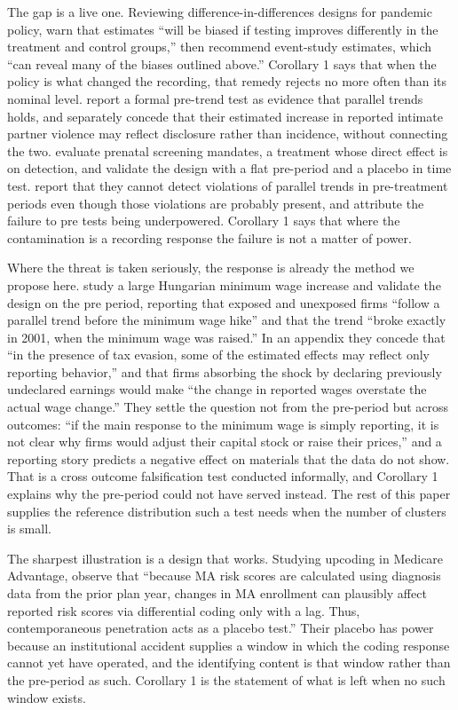 \documentclass[12pt]{article}
\theoremstyle{definition}
\numberwithin{equation}{section}
\begin{document}
The gap is a live one. Reviewing difference-in-differences designs for pandemic
policy,
\citet{goodmanbacon2020covid} warn that estimates ``will be biased if testing
improves differently in the treatment and control groups,'' then recommend
event-study estimates, which ``can reveal many of the biases outlined above.''
Corollary 1 says that when the policy is what changed the
recording, that remedy rejects no more often than its nominal level.
\citet{richardson2025ipv} report a formal pre-trend test as evidence that
parallel trends holds, and separately concede that their estimated increase in
reported intimate partner violence may reflect disclosure rather than incidence,
without connecting the two. \citet{baum2026syphilis} evaluate prenatal screening
mandates, a treatment whose direct effect is on detection, and validate the design
with a flat pre-period and a placebo in time test. \citet{callaway2023pandemic}
report that they cannot detect violations of parallel trends in pre-treatment periods even though those violations are probably present, and attribute the
failure to pre tests being underpowered. Corollary 1 says that
where the contamination is a recording response the failure is not a matter of
power.

Where the threat is taken seriously, the response is already the method we
propose here. \citet{harasztosi2019minwage} study a large
Hungarian minimum wage increase and validate the design on the pre period,
reporting that exposed and unexposed firms ``follow a parallel trend before the
minimum wage hike'' and that the trend ``broke exactly in 2001, when the minimum
wage was raised.'' In an appendix they concede that ``in the presence of tax
evasion, some of the estimated effects may reflect only reporting behavior,'' and
that firms absorbing the shock by declaring previously undeclared earnings would
make ``the change in reported wages overstate the actual wage change.'' They
settle the question not from the pre-period but across outcomes: ``if the main
response to the minimum wage is simply reporting, it is not clear why firms would
adjust their capital stock or raise their prices,'' and a reporting story predicts
a negative effect on materials that the data do not show. That is a cross outcome
falsification test conducted informally, and Corollary 1 explains
why the pre-period could not have served instead. The rest of this paper supplies
the reference distribution such a test needs when the number of clusters is
small.

The sharpest illustration is a design that works. Studying upcoding in Medicare
Advantage, \citet{geruso2020upcoding} observe that ``because MA risk scores are
calculated using diagnosis data from the prior plan year, changes in MA
enrollment can plausibly affect reported risk scores via differential coding only
with a lag. Thus, contemporaneous penetration acts as a placebo test.'' Their
placebo has power because an institutional accident supplies a window in which
the coding response cannot yet have operated, and the identifying content is that
window rather than the pre-period as such. Corollary 1 is the
statement of what is left when no such window exists.
\end{document}
